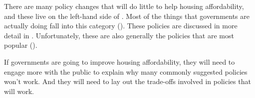 There are many policy changes that will do little to help housing affordability, and these live on the left-hand side of .
Most of the things that governments are actually doing fall into this category ().
These policies are discussed in more detail in .
Unfortunately, these are also generally the policies that are most popular ().

If governments are going to improve housing affordability, they will need to engage more with the public to explain why many commonly suggested policies won't work.
And they will need to lay out the trade-offs involved in policies that will work.

